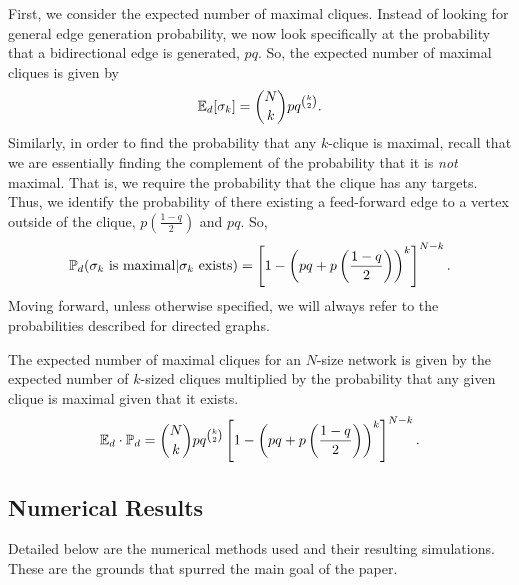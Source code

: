 First, we consider the expected number of maximal cliques. Instead of looking for general edge generation probability, we now look specifically at
the probability that a bidirectional edge is generated, $pq$. So, the expected number of maximal cliques is given by
\begin{align}
    \label{eq:e of max directed}
    \mathbb{E}_d[\sigma_k] = \binom{N}{k}pq^{\binom{k}{2}}.
\end{align}
Similarly, in order to find the probability that any $k$-clique is maximal, recall that we are essentially finding the complement of the probability that it is \textit{not} maximal. That is, we require the probability that the clique has any targets. Thus, we identify the probability of there existing a feed-forward edge to a vertex outside of the clique, $p \left(\frac{1-q}{2} \right)$ and $pq$. So,
\begin{align}
    \label{eq:p max directed}
    \mathbb{P}_d(\sigma_k \mbox{ is maximal}|\sigma_k \mbox{ exists}) = \left[ 1- \left(pq + p   \left(\frac{1-q}{2} \right) \right)^k \right]^{N-k}.
\end{align} 
Moving forward, unless otherwise specified, we will always refer to the probabilities described for directed graphs.

The expected number of maximal cliques for an $N$-size network is given by the expected number of $k$-sized cliques multiplied by the probability that any given clique is maximal given that it exists.
\begin{gather}
    \label{eq:expected max directed}
    \mathbb{E}_d \cdot \mathbb{P}_d = \binom{N}{k}pq^{\binom{k}{2}} \left[ 1- \left(pq + p   \left(\frac{1-q}{2} \right) \right)^k \right]^{N-k}.
\end{gather}

\subsection{Numerical Results}%
\label{sub:Numerical Results}

Detailed below are the numerical methods used and their resulting simulations. These are the grounds that spurred the main goal of the paper.

